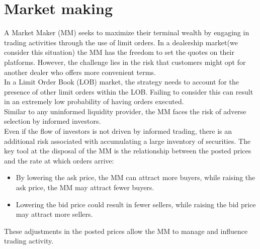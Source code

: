 \chapter{Market making}
\label{chap:market_making}
A Market Maker (MM) seeks to maximize their terminal wealth by engaging in trading activities through the use of limit orders. In a dealership market(we consider this situation) the MM has the freedom to set the quotes on their platforms. However, the challenge lies in the risk that customers might opt for another dealer who offers more convenient terms.\\
In a Limit Order Book (LOB) market, the strategy needs to account for the presence of other limit orders within the LOB. Failing to consider this can result in an extremely low probability of having orders executed.\\
Similar to any uninformed liquidity provider, the MM faces the risk of adverse selection by informed investors.\\
Even if the flow of investors is not driven by informed trading, there is an additional risk associated with accumulating a large inventory of securities. The key tool at the disposal of the MM is the relationship between the posted prices and the rate at which orders arrive:
\begin{itemize}
	\item By lowering the ask price, the MM can attract more buyers, while raising the ask price, the MM may attract fewer buyers.\\
	\item Lowering the bid price could result in fewer sellers, while raising the bid price may attract more sellers.
\end{itemize}
These adjustments in the posted prices allow the MM to manage and influence trading activity.
